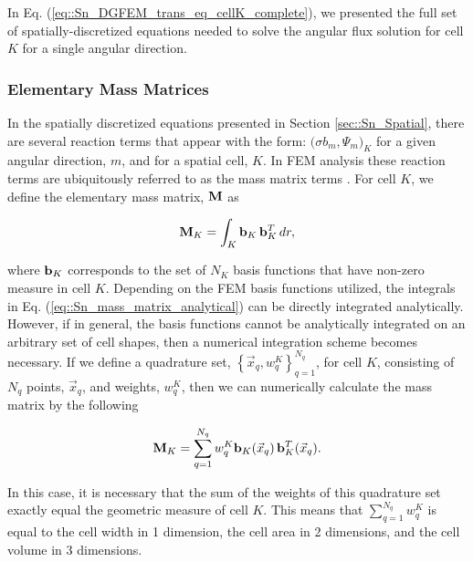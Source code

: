 In Eq. (\ref{eq::Sn_DGFEM_trans_eq_cellK_complete}), we presented the full set of spatially-discretized equations needed to solve the angular flux solution for cell $K$ for a single angular direction. 

\subsubsection{Elementary Mass Matrices}
\label{sec::Sn_Spatial_Matrices_Mass}

In the spatially discretized equations presented in Section \ref{sec::Sn_Spatial}, there are several reaction terms that appear with the form: $\Big( \sigma  b_m , \Psi_m  \Big)_K$ for a given angular direction, $m$, and for a spatial cell, $K$. In FEM analysis these reaction terms are ubiquitously referred to as the mass matrix terms \cite{zeinkiewicz2005finite,akin1982application}. For cell $K$, we define the elementary mass matrix, ${\bf M}$ as

\begin{equation}
\label{eq::Sn_mass_matrix_analytical}
{\bf M}_K =    \int_K {\bf b}_K \, {\bf b}_K^T \, d r ,
\end{equation}

\noindent where ${\bf b}_K$ corresponds to the set of $N_K$ basis functions that have non-zero measure in cell $K$. Depending on the FEM basis functions utilized, the integrals in Eq. (\ref{eq::Sn_mass_matrix_analytical}) can be directly integrated analytically. However, if in general, the basis functions cannot be analytically integrated on an arbitrary set of cell shapes, then a numerical integration scheme becomes necessary. If we define a quadrature set, $\left\{  \vec{x}_q , w_q^{K}  \right\}_{q=1}^{N_q}$, for cell $K$, consisting of $N_q$ points, $\vec{x}_q$, and weights, $w_q^K$, then we can numerically calculate the mass matrix by the following

\begin{equation}
\label{eq::Sn_mass_matrix_numerical}
{\bf M}_K =    \sum_{q = 1}^{N_q} w_{q}^K {\bf b}_K (\vec{x}_q) \, {\bf b}_K^T (\vec{x}_q)  .
\end{equation}

\noindent In this case, it is necessary that the sum of the weights of this quadrature set exactly equal the geometric measure of cell $K$. This means that $\sum_{q = 1}^{N_q} w_{q}^K$ is equal to the cell width in 1 dimension, the cell area in 2 dimensions, and the cell volume in 3 dimensions.

